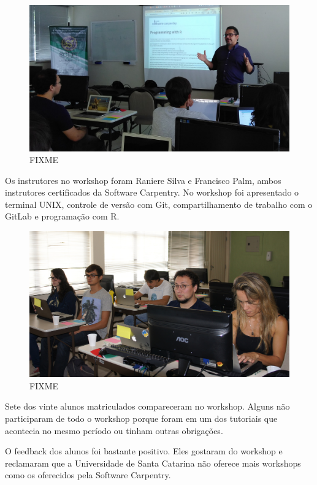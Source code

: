 \documentclass[12pt]{article}
\begin{document}
\noindent  %
\begin{figure}[!htb]
\center
\includegraphics[height=.3\textheight]{swc-francisco.jpg}
\caption{FIXME}
\end{figure}

Os instrutores no workshop foram Raniere Silva e Francisco Palm,
ambos instrutores certificados da Software Carpentry.
No workshop foi apresentado o terminal UNIX, controle de versão com Git,
compartilhamento de trabalho com o GitLab e programação com R.

\noindent  %
\begin{figure}[!htb]
\center
\includegraphics[height=.3\textheight]{swc-students.jpg}
\caption{FIXME}
\end{figure}

Sete dos vinte alunos matriculados compareceram no workshop.
Alguns não participaram de todo o workshop porque foram em um dos tutoriais que
acontecia no mesmo período ou tinham outras obrigações.

O feedback dos alunos foi bastante positivo. Eles gostaram do workshop
e reclamaram que a Universidade de Santa Catarina não oferece mais workshops
como os oferecidos pela Software Carpentry.
\end{document}
